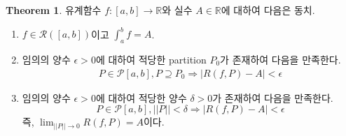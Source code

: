 \documentclass[12pt]{article}
\theoremstyle{definition}
\newtheorem{thm}{Theorem}[section]
\def\RR{\mathbb{R}}
\def\eps{\epsilon}
\def\calR{\mathcal{R}}
\newcommand{\abs}[1]{\left\vert#1\right\vert}
\newcommand{\norm}[1]{\left\vert\left\vert#1\right\vert\right\vert}
\begin{document}
\begin{thm} \label{thm rm int}
	유계함수 \(f: [a, b] \rightarrow \RR\)와 실수 \(A \in \RR\)에 대하여 다음은 동치.
	\begin{enumerate}[label=(\alph*), leftmargin=2\parindent]
		\item
		\(f \in \calR([a, b])\)이고 \(\int_a^b f = A\).
		\item
		임의의 양수 \(\eps > 0\)에 대하여 적당한 partition \(P_0\)가 존재하여 다음을 만족한다.
		\begin{gather*}
			P \in \mathcal{P}[a, b], P \supseteq P_0 \Longrightarrow \abs{R(f, P) - A} < \eps
		\end{gather*}
		\item
		임의의 양수 \(\eps > 0\)에 대하여 적당한 양수 \(\delta > 0\)가 존재하여 다음을 만족한다.
		\begin{equation} \label{eq norm}
			P \in \mathcal{P}[a, b], \norm{P} < \delta \Longrightarrow \abs{R(f, P) - A} < \eps
		\end{equation}
		즉, \(\lim_{\norm{P} \rightarrow 0} R(f, P) = A\)이다.
	\end{enumerate}
\end{thm}
\end{document}
